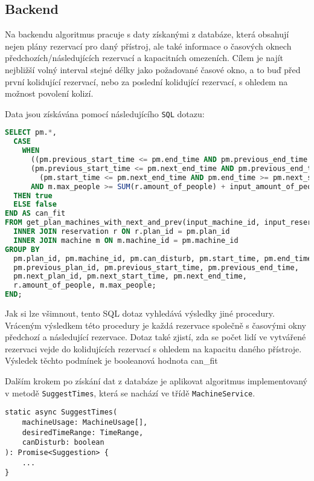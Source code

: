 \subsection{Backend}
Na backendu algoritmus pracuje s daty získanými z databáze, která obsahují nejen plány rezervací pro daný přístroj, ale také informace o časových oknech předchozích/následujících rezervací a kapacitních omezeních. Cílem je najít nejbližší volný interval stejné délky jako požadované časové okno, a to buď před první kolidující rezervací, nebo za poslední kolidující rezervací, s ohledem na možnost povolení kolizí.

Data jsou získávána pomocí následujícího \texttt{SQL} dotazu:
\begin{lstlisting}[language=SQL]
SELECT pm.*,
  CASE
    WHEN
      ((pm.previous_start_time <= pm.end_time AND pm.previous_end_time >= pm.start_time) OR
      (pm.previous_start_time <= pm.next_end_time AND pm.previous_end_time >= pm.next_start_time) OR
        (pm.start_time <= pm.next_end_time AND pm.end_time >= pm.next_start_time))
      AND m.max_people >= SUM(r.amount_of_people) + input_amount_of_people
  THEN true
  ELSE false
END AS can_fit
FROM get_plan_machines_with_next_and_prev(input_machine_id, input_reservation_date) pm
  INNER JOIN reservation r ON r.plan_id = pm.plan_id
  INNER JOIN machine m ON m.machine_id = pm.machine_id
GROUP BY
  pm.plan_id, pm.machine_id, pm.can_disturb, pm.start_time, pm.end_time,
  pm.previous_plan_id, pm.previous_start_time, pm.previous_end_time,
  pm.next_plan_id, pm.next_start_time, pm.next_end_time,
  r.amount_of_people, m.max_people;
END;
\end{lstlisting}
Jak si lze všimnout, tento SQL dotaz vyhledává výsledky jiné procedury. Vráceným výsledkem této procedury je každá rezervace společně s časovými okny předchozí a následující rezervace.
Dotaz také zjistí, zda se počet lidí ve vytvářené rezervaci vejde do kolidujících rezervací s ohledem na kapacitu daného přístroje. Výsledek těchto podmínek je booleanová hodnota can\_fit

Dalším krokem po získání dat z databáze je aplikovat algoritmus implementovaný v metodě \texttt{SuggestTimes}, která se nachází ve třídě \texttt{MachineService}. 

\begin{lstlisting}
static async SuggestTimes(
    machineUsage: MachineUsage[],
    desiredTimeRange: TimeRange,
    canDisturb: boolean
): Promise<Suggestion> {
    ...
}
\end{lstlisting}

